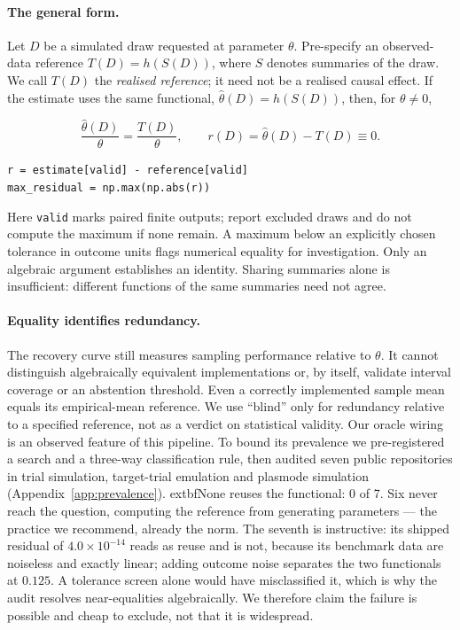 \paragraph{The general form.}
Let $D$ be a simulated draw requested at parameter $\theta$. Pre-specify an
observed-data reference $T(D)=h(S(D))$, where $S$ denotes summaries of the draw.
We call $T(D)$ the \emph{realised reference}; it need not be a realised causal
effect. If the estimate uses the same functional,
$\hat\theta(D)=h(S(D))$, then, for $\theta\ne0$,
\begin{mdframed}[linewidth=0.5pt,innertopmargin=4pt,innerbottommargin=4pt,nobreak=true]
\[
\frac{\hat\theta(D)}{\theta}=\frac{T(D)}{\theta},
\qquad r(D)=\hat\theta(D)-T(D)\equiv0.
\]
\begin{center}
\texttt{r = estimate[valid] - reference[valid]}\\
\texttt{max\_residual = np.max(np.abs(r))}
\end{center}
\end{mdframed}
Here \texttt{valid} marks paired finite outputs; report excluded draws and do
not compute the maximum if none remain. A maximum below an explicitly chosen
tolerance in outcome units flags numerical equality for investigation.
Only an algebraic argument establishes an identity. Sharing summaries alone
is insufficient: different functions of the same summaries need not agree.

\paragraph{Equality identifies redundancy.}
The recovery curve still measures sampling performance relative to $\theta$.
It cannot distinguish algebraically equivalent implementations or, by itself,
validate interval coverage or an abstention threshold. Even a correctly
implemented sample mean equals its empirical-mean reference. We use ``blind''
only for redundancy relative to a specified reference, not as a verdict on
statistical validity. Our oracle wiring is an observed feature of this
pipeline. To bound its prevalence we pre-registered a search and a
three-way classification rule, then audited seven public repositories in
trial simulation, target-trial emulation and plasmode simulation
(Appendix~\ref{app:prevalence}). 	extbf{None reuses the functional: 0 of 7.}
Six never reach the question, computing the reference from generating
parameters --- the practice we recommend, already the norm. The seventh is
instructive: its shipped residual of $4.0\times10^{-14}$ reads as reuse and is
not, because its benchmark data are noiseless and exactly linear; adding
outcome noise separates the two functionals at $0.125$. A tolerance screen
alone would have misclassified it, which is why the audit resolves
near-equalities algebraically. We therefore claim the failure is possible
and cheap to exclude, not that it is widespread.

